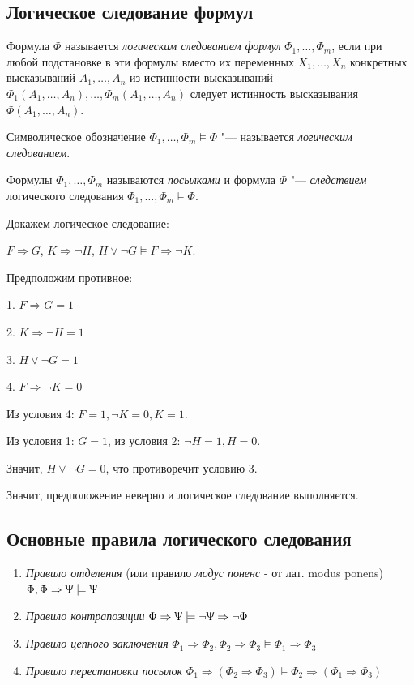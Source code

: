 \subsection*{Логическое следование формул}
\begin{definition}
    Формула $\Phi$ называется \textit{логическим следованием формул} $\Phi_1,\ldots,\Phi_m$, если при любой подстановке в эти формулы вместо их переменных $X_1,\ldots,X_n$ конкретных высказываний $A_1,\ldots,A_n$ из истинности высказываний $\Phi_1(A_1,\ldots,A_n),\ldots,\Phi_m(A_1,\ldots,A_n)$ следует истинность высказывания $\Phi(A_1,\ldots,A_n)$.

    Символическое обозначение $\Phi_1,\ldots,\Phi_m \models \Phi$ "--- называется \textit{логическим следованием}.

    Формулы $\Phi_1,\ldots,\Phi_m$ называются \textit{посылками} и формула $\Phi$ "--- \textit{следствием} логического следования $\Phi_1,\ldots,\Phi_m \models \Phi$.
\end{definition}

\begin{example}
    Докажем логическое следование:

    $F\Rightarrow G$, $K\Rightarrow \lnot H$, $H\lor\lnot G \models F\Rightarrow\lnot K$.
    
    Предположим противное:
    
        1. $F\Rightarrow G = 1$

        2. $K\Rightarrow\lnot H = 1$

        3. $H\lor\lnot G = 1$

        4. $F\Rightarrow\lnot K = 0$
    
    
    Из условия 4: $F = 1, \lnot K = 0, K = 1$.

    Из условия 1: $G = 1$, из условия 2: $\lnot H = 1, H = 0$.
    
    Значит, $H\lor\lnot G = 0$, что противоречит условию 3.

    Значит, предположение неверно и логическое следование выполняется.
\end{example}

\subsection*{Основные правила логического следования}
\begin{enumerate}
    \item \textit{Правило отделения} (или правило \textit{модус поненс} - от лат. modus ponens)
        $\Phi,\Phi\Rightarrow\Uppsi\models\Uppsi$

    \item \textit{Правило контрапозиции} 
    $\Phi\Rightarrow\Uppsi\models\lnot\Uppsi\Rightarrow\lnot\Phi$

    \item \textit{Правило цепного заключения} 
    $\Phi_1\Rightarrow\Phi_2,\Phi_2\Rightarrow\Phi_3\models\Phi_1\Rightarrow\Phi_3$
    \item \textit{Правило перестановки посылок} 
    $\Phi_1\Rightarrow(\Phi_2\Rightarrow\Phi_3)\models\Phi_2\Rightarrow(\Phi_1\Rightarrow\Phi_3)$
\end{enumerate}


